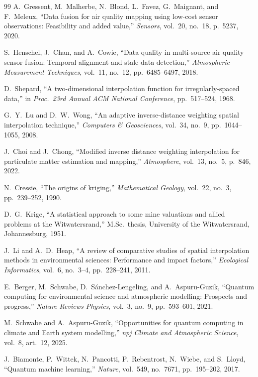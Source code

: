 \documentclass[conference]{IEEEtran}
\begin{document}
\begin{thebibliography}{99}
A.~Gressent, M.~Malherbe, N.~Blond, L.~Favez, G.~Maignant,
and F.~Meleux,
``Data fusion for air quality mapping using low-cost sensor
observations: Feasibility and added value,''
\emph{Sensors}, vol.~20, no.~18, p.~5237, 2020.

S.~Henschel, J.~Chan, and A.~Cowie,
``Data quality in multi-source air quality sensor fusion: Temporal
alignment and stale-data detection,''
\emph{Atmospheric Measurement Techniques}, vol.~11, no.~12,
pp.~6485--6497, 2018.

D.~Shepard,
``A two-dimensional interpolation function for irregularly-spaced
data,''
in \emph{Proc.~23rd Annual ACM National Conference}, pp.~517--524,
1968.

G.~Y.~Lu and D.~W.~Wong,
``An adaptive inverse-distance weighting spatial interpolation
technique,''
\emph{Computers \& Geosciences}, vol.~34, no.~9, pp.~1044--1055, 2008.

J.~Choi and J.~Chong,
``Modified inverse distance weighting interpolation for particulate
matter estimation and mapping,''
\emph{Atmosphere}, vol.~13, no.~5, p.~846, 2022.

N.~Cressie,
``The origins of kriging,''
\emph{Mathematical Geology}, vol.~22, no.~3, pp.~239--252, 1990.

D.~G.~Krige,
``A statistical approach to some mine valuations and allied problems
at the Witwatersrand,''
M.Sc.~thesis, University of the Witwatersrand, Johannesburg, 1951.

J.~Li and A.~D.~Heap,
``A review of comparative studies of spatial interpolation methods in
environmental sciences: Performance and impact factors,''
\emph{Ecological Informatics}, vol.~6, no.~3--4, pp.~228--241, 2011.

E.~Berger, M.~Schwabe, D.~Sánchez-Lengeling, and A.~Aspuru-Guzik,
``Quantum computing for environmental science and atmospheric
modelling: Prospects and progress,''
\emph{Nature Reviews Physics}, vol.~3, no.~9, pp.~593--601, 2021.

M.~Schwabe and A.~Aspuru-Guzik,
``Opportunities for quantum computing in climate and Earth system
modelling,''
\emph{npj Climate and Atmospheric Science}, vol.~8, art.~12, 2025.

J.~Biamonte, P.~Wittek, N.~Pancotti, P.~Rebentrost,
N.~Wiebe, and S.~Lloyd,
``Quantum machine learning,''
\emph{Nature}, vol.~549, no.~7671, pp.~195--202, 2017.


\end{thebibliography}
\end{document}
